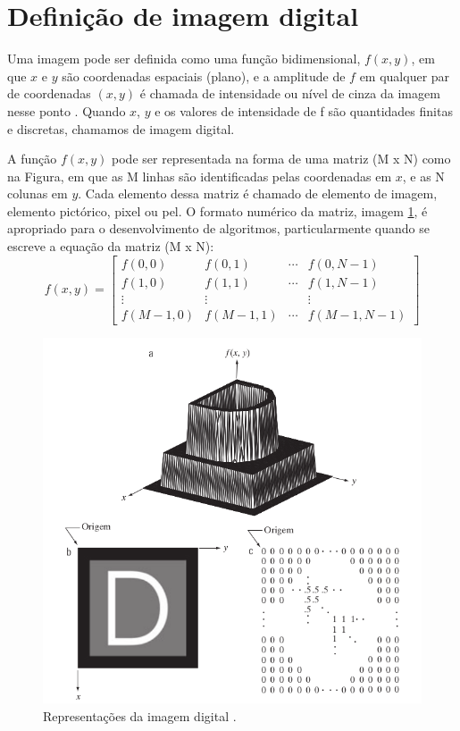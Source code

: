 \documentclass[
  brazilian,
]{book}
\begin{document}
\hypertarget{definiuxe7uxe3o-de-imagem-digital}{%
\section{Definição de imagem digital}\label{definiuxe7uxe3o-de-imagem-digital}}

Uma imagem pode ser definida como uma função bidimensional, \(f(x, y)\), em que \(x\) e \(y\) são coordenadas espaciais (plano), e a amplitude de \(f\) em qualquer par de coordenadas \((x, y)\) é chamada de intensidade ou nível de cinza da imagem nesse ponto \autocite{gonzalez2010}. Quando \(x\), \(y\) e os valores de intensidade de f são quantidades finitas e discretas, chamamos de imagem digital.

A função \(f(x, y)\) pode ser representada na forma de uma matriz (M x N) como na Figura, em que as M linhas são identificadas pelas coordenadas em \(x\), e as N colunas em \(y\). Cada elemento dessa matriz é chamado de elemento de imagem, elemento pictórico, pixel ou pel. O formato numérico da matriz, imagem \ref{fig:imagemdigital}, é apropriado para o desenvolvimento de algoritmos, particularmente quando se escreve a equação da matriz (M x N):
\[f(x,y) = \begin{bmatrix}
 f(0,0)   & f(0,1)     & \cdots & f(0,N-1)    \\ 
 f(1,0)   & f(1,1)     & \cdots & f(1, N-1)   \\ 
 \vdots   & \vdots    & &         \vdots      \\ 
 f(M-1,0) & f(M-1, 1)  & \cdots & f(M-1, N-1)
\end{bmatrix}\]



\begin{figure}

{\centering \includegraphics[width=0.7\linewidth]{imagens/02-formacao/imagemdigital} 

}

\caption{Representações da imagem digital \autocite[p.36]{gonzalez2010}.}\label{fig:imagemdigital}
\end{figure}
\end{document}

